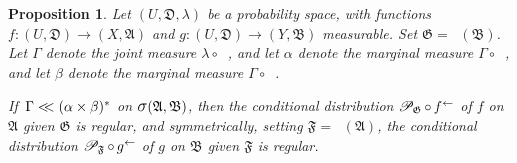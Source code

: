 \documentclass[
twoside=true,
paper=letter,
fontsize=9pt,
pagesize=auto,
leqno,
openany,
headsepline,
overfullrule,
]{scrbook}
\theoremstyle{plain}
\theoremstyle{plain}
\newtheorem{prop}[thm]{Proposition}
\theoremstyle{definition}
\theoremstyle{bfnoteitalic}
\theoremstyle{bfnoteroman}
\newcommand{\sigalg}[1]{\mathfrak{#1}}
\newcommand{\cali}[1]{\mathscr{#1}}
\newcommand{\condprobop}[1]{\mathop{\cali{P}\hspace{-1pt}}\nolimits_{#1}}
\newcommand{\sagb}{\mathop{\hbox{\large{$\sigma$}}}\nolimits}
\newcommand{\preimage}[1]{\mathop{#1^{\leftarrow}}}
\newcommand{\sigmaalgebra}{\sigalg{A}}
\newcommand{\sigmaalgebraii}{\sigalg{B}}
\newcommand{\productsig}[2]{\sagb(#1,#2)}
\newcommand{\funcf}{f}
\newcommand{\funcg}{g}
\newcommand{\measurespace}{X}
\newcommand{\measurespaceii}{Y}
\newcommand{\abscont}{\mathrel{< \kern-3.5pt <}}
\newcommand{\measlambda}{\lambda}
\newcommand{\projectionone}{\pi_1}
\newcommand{\projectiontwo}{\pi_2}
\newcommand{\uspace}{U}%
\newcommand{\uspacesig}{\sigalg{D}}
\newcommand{\measonprod}{\Gamma}%
\newcommand{\marginalone}{\alpha}%
\newcommand{\marginaltwo}{\beta}%
\begin{document}
\begin{prop}\label{absolute_continuity_regular}
Let
$(\uspace, \uspacesig, \measlambda)$
be a probability space, with functions
$\funcf:(\uspace,\uspacesig)\to (\measurespace,\sigmaalgebra)$
and
$\funcg:(\uspace,\uspacesig)\to (\measurespaceii,\sigmaalgebraii)$
measurable.
Set
$\sigalg{G} = \preimage{\funcg}(\sigmaalgebraii)$.
Let $\measonprod$ denote the joint measure
$\measlambda\circ\preimage{({\funcf,\funcg})}$,
and let $\marginalone$  denote the marginal measure $\measonprod\circ \preimage{\projectionone}$,
and let $\marginaltwo$ denote the marginal measure $\measonprod\circ \preimage{\projectiontwo}$.

If\,
$\measonprod \abscont (\marginalone\times\marginaltwo)^*$
on
$\productsig{\sigmaalgebra}{\sigmaalgebraii}$,
then the conditional distribution
$\condprobop{\sigalg{G}}\circ \preimage{\funcf}$ of $\funcf$ on
$\sigmaalgebra$ given $\sigalg{G}$ is regular, and symmetrically, setting
$\sigalg{F} = \preimage{\funcf}(\sigmaalgebra)$, the conditional distribution
$\condprobop{\sigalg{F}}\circ \preimage{\funcg}$ of $\funcg$ on
$\sigmaalgebraii$ given $\sigalg{F}$ is regular.
\end{prop}
\end{document}
